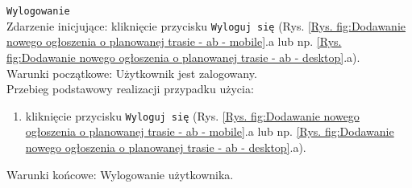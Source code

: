 \texttt{Wylogowanie} \\
Zdarzenie inicjujące: kliknięcie przycisku \texttt{Wyloguj się} (Rys. \ref{Rys. fig:Dodawanie nowego ogłoszenia o planowanej trasie - ab - mobile}.a lub np. \ref{Rys. fig:Dodawanie nowego ogłoszenia o planowanej trasie - ab - desktop}.a). \\
Warunki początkowe: Użytkownik jest zalogowany. \\
Przebieg podstawowy realizacji przypadku użycia:
\begin{enumerate}
    \item kliknięcie przycisku \texttt{Wyloguj się} (Rys. \ref{Rys. fig:Dodawanie nowego ogłoszenia o planowanej trasie - ab - mobile}.a lub np. \ref{Rys. fig:Dodawanie nowego ogłoszenia o planowanej trasie - ab - desktop}.a).
\end{enumerate}
Warunki końcowe: Wylogowanie użytkownika.\\

